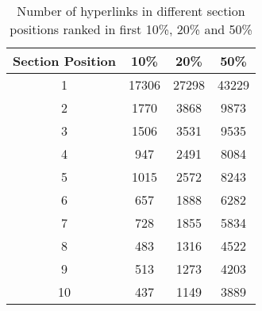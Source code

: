 \begin{table}[h]
\centering
\begin{tabular}{|c|c|c|c|}
\hline
Section Position & 10\% & 20\% & 50\%  \\
\hline
1 & 17306 & 27298 & 43229 \\
\hline
2 & 1770 & 3868 & 9873 \\
\hline
3 & 1506 & 3531 & 9535 \\
\hline
4 & 947 & 2491 & 8084 \\
\hline
5 & 1015 & 2572 & 8243 \\
\hline
6 & 657 & 1888 & 6282 \\
\hline
7 & 728 & 1855 & 5834 \\
\hline
8 & 483 & 1316 & 4522 \\
\hline
9 & 513 & 1273 & 4203 \\
\hline
10 & 437 & 1149 & 3889 \\
\hline
\end{tabular}
\caption{Number of hyperlinks in different section positions ranked in first 10\%, 20\% and 50\%}
\label{table_cnt1}
\end{table}